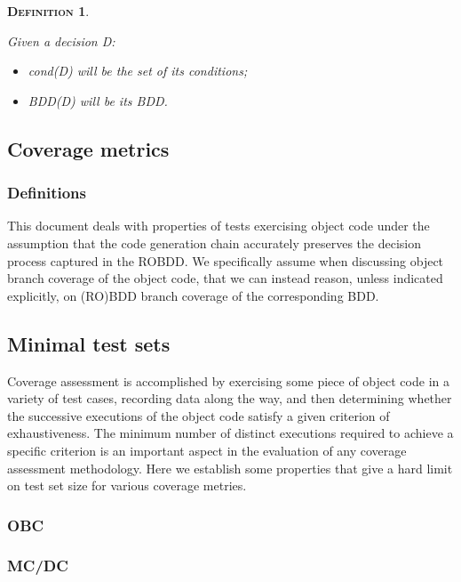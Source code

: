 \documentclass[a4paper,12pt,twoside]{article}
\newtheorem{definition}{\textsc{Definition}}
\begin{document}
\begin{definition}
  \label{def:general-defs}

  Given a decision D:
  \begin{itemize}
  \item cond(D) will be the set of its conditions;
  \item BDD(D) will be its BDD.
  \end{itemize}
\end{definition}

\subsection{Coverage metrics}

\subsubsection{Definitions}


This document deals with properties of tests exercising object code under
the assumption that the code generation chain accurately preserves the
decision process captured in the ROBDD. We specifically assume when
discussing object branch coverage of the object code, that we can instead
reason, unless indicated explicitly, on (RO)BDD branch coverage
of the corresponding BDD.

\subsection{Minimal test sets}

Coverage assessment is accomplished by exercising some piece of object
code in a variety of test cases, recording data along the way, and
then determining whether the successive executions of the object code
satisfy a given criterion of exhaustiveness. The minimum number of distinct
executions required to achieve a specific criterion is an important
aspect in the evaluation of any coverage assessment methodology. Here
we establish some properties that give a hard limit on test set size
for various coverage metries.

\subsubsection{OBC}

\subsubsection{MC/DC}
\end{document}
